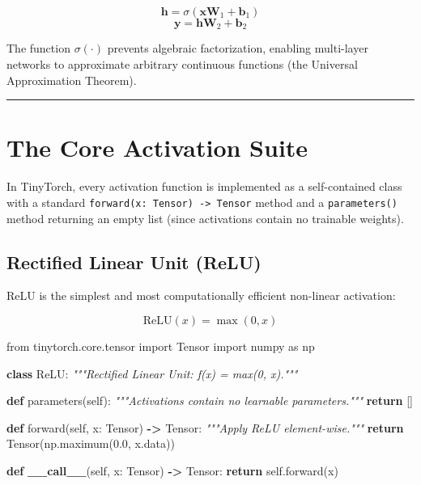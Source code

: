 \documentclass[
  letterpaper,
]{scrbook}
\newenvironment{Shaded}{\begin{snugshade}}{\end{snugshade}}
\newcommand{\CommentTok}[1]{\textcolor[rgb]{0.56,0.35,0.01}{\textit{#1}}}
\newcommand{\ControlFlowTok}[1]{\textcolor[rgb]{0.13,0.29,0.53}{\textbf{#1}}}
\newcommand{\FloatTok}[1]{\textcolor[rgb]{0.00,0.00,0.81}{#1}}
\newcommand{\FunctionTok}[1]{\textcolor[rgb]{0.13,0.29,0.53}{\textbf{#1}}}
\newcommand{\ImportTok}[1]{#1}
\newcommand{\KeywordTok}[1]{\textcolor[rgb]{0.13,0.29,0.53}{\textbf{#1}}}
\newcommand{\NormalTok}[1]{#1}
\newcommand{\OperatorTok}[1]{\textcolor[rgb]{0.81,0.36,0.00}{\textbf{#1}}}
\newcommand{\VariableTok}[1]{\textcolor[rgb]{0.00,0.00,0.00}{#1}}
\begin{document}
\[\mathbf{h} = \sigma(\mathbf{x} \mathbf{W}_1 + \mathbf{b}_1)\]
\[\mathbf{y} = \mathbf{h} \mathbf{W}_2 + \mathbf{b}_2\]

The function \(\sigma(\cdot)\) prevents algebraic factorization,
enabling multi-layer networks to approximate arbitrary continuous
functions (the Universal Approximation Theorem).

\begin{center}\rule{0.5\linewidth}{0.5pt}\end{center}

\section{The Core Activation Suite}\label{the-core-activation-suite}

In TinyTorch, every activation function is implemented as a
self-contained class with a standard
\texttt{forward(x:\ Tensor)\ -\textgreater{}\ Tensor} method and a
\texttt{parameters()} method returning an empty list (since activations
contain no trainable weights).

\subsection{Rectified Linear Unit
(ReLU)}\label{rectified-linear-unit-relu}

ReLU is the simplest and most computationally efficient non-linear
activation:

\[\text{ReLU}(x) = \max(0, x)\]

\begin{Shaded}
\begin{Highlighting}[]
\ImportTok{from}\NormalTok{ tinytorch.core.tensor }\ImportTok{import}\NormalTok{ Tensor}
\ImportTok{import}\NormalTok{ numpy }\ImportTok{as}\NormalTok{ np}

\KeywordTok{class}\NormalTok{ ReLU:}
    \CommentTok{"""Rectified Linear Unit: f(x) = max(0, x)."""}

    \KeywordTok{def}\NormalTok{ parameters(}\VariableTok{self}\NormalTok{):}
        \CommentTok{"""Activations contain no learnable parameters."""}
        \ControlFlowTok{return}\NormalTok{ []}

    \KeywordTok{def}\NormalTok{ forward(}\VariableTok{self}\NormalTok{, x: Tensor) }\OperatorTok{{-}\textgreater{}}\NormalTok{ Tensor:}
        \CommentTok{"""Apply ReLU element{-}wise."""}
        \ControlFlowTok{return}\NormalTok{ Tensor(np.maximum(}\FloatTok{0.0}\NormalTok{, x.data))}

    \KeywordTok{def} \FunctionTok{\_\_call\_\_}\NormalTok{(}\VariableTok{self}\NormalTok{, x: Tensor) }\OperatorTok{{-}\textgreater{}}\NormalTok{ Tensor:}
        \ControlFlowTok{return} \VariableTok{self}\NormalTok{.forward(x)}
\end{Highlighting}
\end{Shaded}
\end{document}
